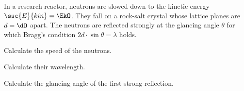 In a research reactor, neutrons are slowed down to the kinetic energy $\ssc{E}{kin} = \EkO$. They fall on a rock-salt crystal whose lattice planes are $d = \dO$ apart. The neutrons are reflected strongly at the glancing angle $\theta$ for which Bragg's condition $2d\cdot\sin\theta = \lambda$ holds.

\begin{abcliste}
\abc Calculate the speed of the neutrons.

\abc Calculate their wavelength.

\abc Calculate the glancing angle of the first strong reflection.
\end{abcliste}

